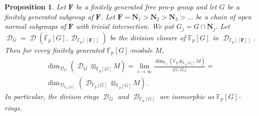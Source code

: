 \documentclass[11pt]{amsart}
\newtheorem{pro}[lem]{Proposition}
\numberwithin{claimcounter}{lem}
\DeclareMathOperator{\D}{\mathcal D}
\newcommand{\F}{\mathbb{F}}
\begin{document}
\begin{pro} \label{divclousure}  Let $\mathbf F$ be a finitely generated free pro-$p$ group and let $G$ be a finitely generated subgroup of $\mathbf F$. 
 Let $\mathbf F=\mathbf N_1>\mathbf N_2>\mathbf N_3> \ldots$ be a chain of open normal subgroups of $\mathbf F$ with trivial intersection. We put $G_j=G\cap \mathbf N_j$. Let $\D_G=\D(\F_p[G],\D_{\F_p[[\mathbf F]]})$
  be the division closure of $\F_p[G]$ in  $\D_{\F_p[[\mathbf F]]}$. Then for every finitely generated $\F_p[G]$-module $M$,
\begin{multline*}\dim_{\D_G} ( \D_{G}\otimes_{\F_p[G]} M)= \lim_{i\to \infty}\frac{\dim_{\F_p}(\F_p \otimes_{\F_p[ G_i]}M )}{|G:G_i|}=\\
\dim_{\D_{\F_p[ G]}} ( \D_{\F_p[ G]}\otimes_{\F_p[G]} M).\end{multline*}
In particular, 
the divison rings $\D_G$ and $\D_{\F_p[G]}$ are isomorphic as  $\F_p[G]$-rings.
\end{pro}
\end{document}
